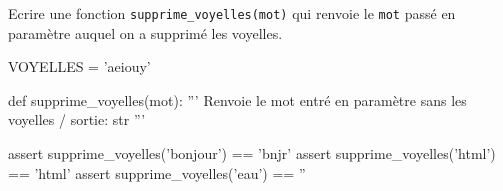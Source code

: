 \documentclass[a4paper,10pt]{report}
\begin{document}
Ecrire une fonction \verb|supprime_voyelles(mot)| qui renvoie le \verb|mot| passé en paramètre auquel on a supprimé les voyelles.

\begin{CodePythontexAlt}[TaillePolice=\large,Largeur=1\linewidth,Centre,PremLigne=1]{}

VOYELLES = 'aeiouy'

def supprime_voyelles(mot):
    ''' Renvoie le mot entré en paramètre sans les voyelles / sortie: str '''








assert supprime_voyelles('bonjour') == 'bnjr'
assert supprime_voyelles('html') == 'html'
assert supprime_voyelles('eau') == ''
    \end{CodePythontexAlt}
\end{document}
